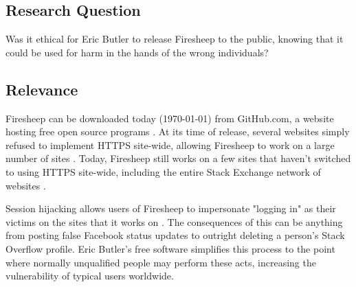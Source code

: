 \documentclass[11pt]{article}
\begin{document}
\begin{multicols}{2}

\section{Research Question}

Was it ethical for Eric Butler to release Firesheep to the public, knowing that it could be used for harm in the hands of the wrong individuals?

\subsection{Relevance}
Firesheep can be downloaded today ({\today}) from GitHub.com, a website hosting free open source programs \cite{firesheep-source}. At its time of release, several websites simply refused to implement HTTPS site-wide, allowing Firesheep to work on a large number of sites \cite{eric-butler}. Today, Firesheep still works on a few sites that haven't switched to using HTTPS site-wide, including the entire Stack Exchange network of websites \cite{stack-exchange}.

Session hijacking allows users of Firesheep to impersonate "logging in" as their victims on the sites that it works on \cite{eric-butler}. The consequences of this can be anything from posting false Facebook status updates to outright deleting a person's Stack Overflow profile. Eric Butler's free software simplifies this process to the point where normally unqualified people may perform these acts, increasing the vulnerability of typical users worldwide.




\end{multicols}
\end{document}
